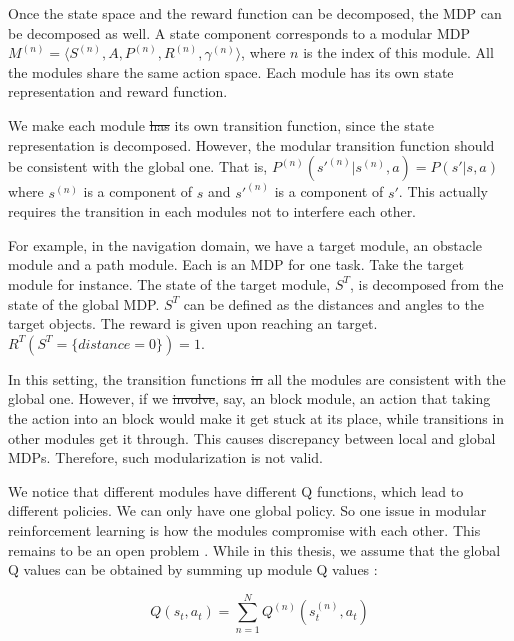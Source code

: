 \documentclass[12pt]{report}	%
\theoremstyle{definition}
\theoremstyle{remark}
\providecommand{\DIFadd}[1]{{\protect\color{blue}\uwave{#1}}} %
\providecommand{\DIFdel}[1]{{\protect\color{red}\sout{#1}}}                      %
\providecommand{\DIFaddbegin}{} %
\providecommand{\DIFaddend}{} %
\providecommand{\DIFdelbegin}{} %
\providecommand{\DIFdelend}{} %
\begin{document}
Once the state space and the reward function can be decomposed, the MDP can be
decomposed as well.  A state component corresponds to a modular MDP
$M^{(n)}=\langle S^{(n)},A,P^{(n)},R^{(n)},\gamma^{(n)} \rangle$, where $n$ is
the index of this module. All the modules share the same action space. Each
module has its own state representation and reward function.
\cite{sprague2003multiple}

We make each module \DIFdelbegin \DIFdel{has }\DIFdelend \DIFaddbegin \DIFadd{have }\DIFaddend its own transition function, since the state representation is
decomposed. However, the modular transition function should be consistent with
the global one. That is, $P^{(n)}(s'^{(n)} | s^{(n)}, a) = P(s'|s, a)$ where
$s^{(n)}$ is a component of $s$ and $s'^{(n)}$ is a component of $s'$. This
actually requires the transition in each modules not to interfere each other.

For example, in the navigation domain, we have a target module, an obstacle
module and a path module. Each is an MDP for one task. Take the target
module for instance. The state of the target module, $S^T$, is decomposed from
the state of the global MDP. $S^T$ can be defined as the distances and angles to
the target objects. The reward is given upon reaching an target.
$R^T(S^T=\{distance=0\}) = 1$.

In this setting, the transition functions \DIFdelbegin \DIFdel{in }\DIFdelend \DIFaddbegin \DIFadd{of }\DIFaddend all the modules are consistent with
the global one. However, if we \DIFdelbegin \DIFdel{involve}\DIFdelend \DIFaddbegin \DIFadd{include}\DIFaddend , say, an block module, \DIFaddbegin \DIFadd{in which }\DIFaddend an action that
taking the action into an block would make it get stuck at its place, while
transitions in other modules get it through. This causes discrepancy between
local and global MDPs. Therefore, such modularization is not valid.

We notice that different modules have different Q functions, which lead to
different policies. We can only have one global policy. So one issue in modular
reinforcement learning is how the modules compromise with each other. This
remains to be an open problem \cite{zhang2014action}. While in this thesis, we
assume that the global Q values can be obtained by summing up module Q values
\cite{russell2003q,sprague2003multiple}:

\begin{equation}
\label{sumQ1}
Q(s_t,a_t) = \sum_{n=1}^{N} Q^{(n)}(s_t^{(n)},a_t)
\end{equation}
\end{document}
